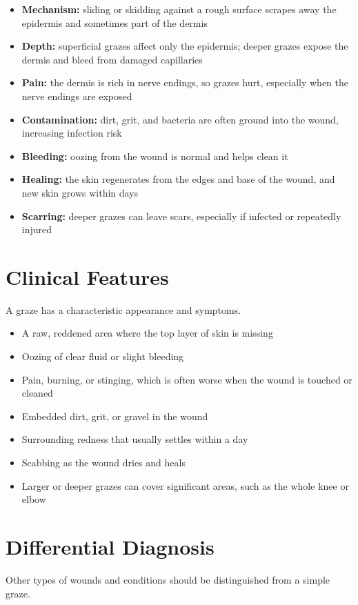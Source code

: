 \begin{itemize}
    \item \textbf{Mechanism:} sliding or skidding against a rough surface scrapes away the epidermis and sometimes part of the dermis
    \item \textbf{Depth:} superficial grazes affect only the epidermis; deeper grazes expose the dermis and bleed from damaged capillaries
    \item \textbf{Pain:} the dermis is rich in nerve endings, so grazes hurt, especially when the nerve endings are exposed
    \item \textbf{Contamination:} dirt, grit, and bacteria are often ground into the wound, increasing infection risk
    \item \textbf{Bleeding:} oozing from the wound is normal and helps clean it
    \item \textbf{Healing:} the skin regenerates from the edges and base of the wound, and new skin grows within days
    \item \textbf{Scarring:} deeper grazes can leave scars, especially if infected or repeatedly injured
\end{itemize}

\section*{Clinical Features}
A graze has a characteristic appearance and symptoms.

\begin{itemize}
    \item A raw, reddened area where the top layer of skin is missing
    \item Oozing of clear fluid or slight bleeding
    \item Pain, burning, or stinging, which is often worse when the wound is touched or cleaned
    \item Embedded dirt, grit, or gravel in the wound
    \item Surrounding redness that usually settles within a day
    \item Scabbing as the wound dries and heals
    \item Larger or deeper grazes can cover significant areas, such as the whole knee or elbow
\end{itemize}

\section*{Differential Diagnosis}
Other types of wounds and conditions should be distinguished from a simple graze.

